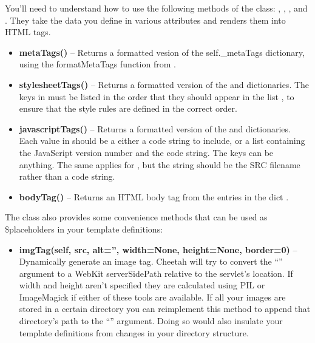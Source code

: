 You'll need to understand how to use the following methods of the
 class: , ,
, and .  They take the data you
define in various attributes and renders them into HTML tags.

\begin{itemize}
\item {\bf metaTags()} -- Returns a formatted vesion of the self.\_metaTags
     dictionary, using the formatMetaTags function from
     .
\item {\bf stylesheetTags()} -- Returns a formatted version of the
      and  dictionaries.
     The keys in  must be listed in the order that
     they should appear in the list , to ensure
     that the style rules are defined in the correct order.
\item {\bf javascriptTags()} -- Returns a formatted version of the
      and  dictionaries.
     Each value in  should be a either a code string
     to include, or a list containing the JavaScript version number and the code
     string. The keys can be anything.  The same applies for
     , but the string should be the SRC filename
     rather than a code string.
\item {\bf bodyTag()} -- Returns an HTML body tag from the entries in the dict
     .
\end{itemize}

The class also provides some convenience methods that can be used as
\$placeholders in your template definitions:

\begin{itemize}
\item {\bf imgTag(self, src, alt='', width=None, height=None, border=0)} --
     Dynamically generate an image tag.  Cheetah will try to convert the
     ``'' argument to a WebKit serverSidePath relative to the
     servlet's location. If width and height aren't specified they are
     calculated using PIL or ImageMagick if either of these tools are available.
     If all your images are stored in a certain directory you can reimplement
     this method to append that directory's path to the ``'' argument.
     Doing so would also insulate your template definitions from changes in your
     directory structure.
\end{itemize}


